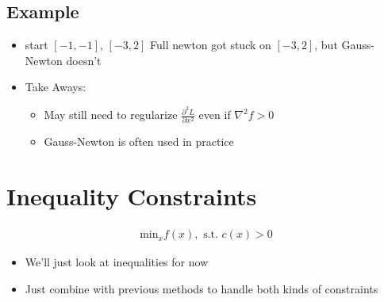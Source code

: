\documentclass[11pt]{article}
\begin{document}
\subsection{Example}
\begin{itemize}
    \item  start $[-1,-1]$, $[-3,2]$ Full newton got stuck on $[-3,2]$, but Gauss-Newton doesn't
\end{itemize}

\begin{itemize}
    \item Take Aways:
    \begin{itemize}
        \item May still need to regularize $\frac{\partial^2 L}{\partial x^2}$ even if $\nabla^2 f>0$
        \item Gauss-Newton is often used in practice
    \end{itemize}
\end{itemize}

\section{Inequality Constraints}
\begin{align*}
    \text{min}_x f(x), \text{ s.t. } c(x)>0
\end{align*}
\begin{itemize}
    \item We'll just look at inequalities for now
    \item Just combine with previous methods to handle both kinds of constraints
\end{itemize}
\end{document}
